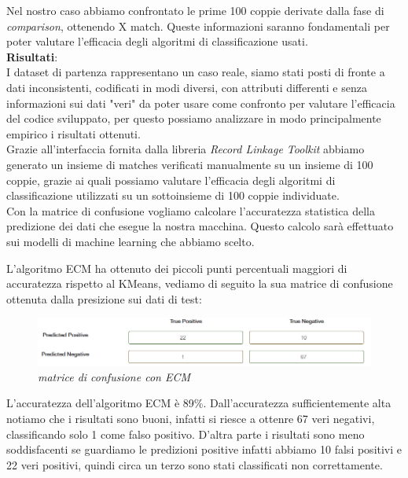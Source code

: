 \documentclass[a4paper,12pt]{article}
\begin{document}
\noindent Nel nostro caso abbiamo confrontato le prime 100 coppie derivate dalla fase di \textit{comparison}, ottenendo X match. Queste informazioni saranno fondamentali per poter valutare l'efficacia degli algoritmi di classificazione usati. \\

\noindent \textbf{Risultati}: \\
\noindent I dataset di partenza rappresentano un caso reale, siamo stati posti di fronte a dati inconsistenti, codificati in modi diversi, con attributi differenti e senza informazioni sui dati "veri" da poter usare come confronto per valutare l'efficacia del codice sviluppato, per questo possiamo analizzare in modo principalmente empirico i risultati ottenuti. \\

\noindent Grazie all'interfaccia fornita dalla libreria \textit{Record Linkage Toolkit} abbiamo generato un insieme di matches verificati manualmente su un insieme di 100 coppie, grazie ai quali possiamo valutare l'efficacia degli algoritmi di classificazione utilizzati su un sottoinsieme di 100 coppie individuate. \\

\noindent Con la matrice di confusione vogliamo calcolare l'accuratezza statistica della predizione dei dati che esegue la nostra macchina. Questo calcolo sarà effettuato sui modelli di machine learning che abbiamo scelto. 

\noindent L'algoritmo ECM ha ottenuto dei piccoli punti percentuali maggiori di accuratezza rispetto al KMeans, vediamo di seguito la sua matrice di confusione ottenuta dalla presizione sui dati di test:

\begin{figure}[H]
	\centering
	\includegraphics[width=0.8\linewidth]{img/confusion_ecm.png}
	\caption{\textit{matrice di confusione con ECM}}
\end{figure}

\noindent L'accuratezza dell'algoritmo ECM è 89\%. Dall'accuratezza sufficientemente alta notiamo che i risultati sono  buoni, infatti si riesce a ottenre 67 veri negativi, classificando solo 1 come falso positivo. D'altra parte i risultati sono meno soddisfacenti se guardiamo le predizioni positive infatti abbiamo 10 falsi positivi e 22 veri positivi, quindi circa un terzo sono stati classificati non correttamente. \\
\end{document}

